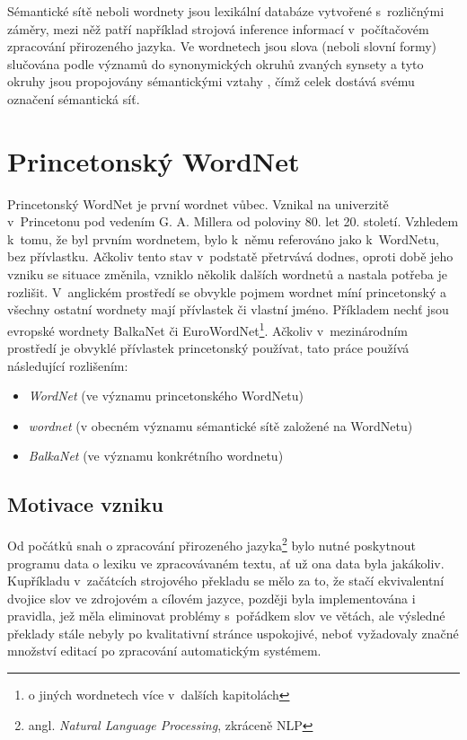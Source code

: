\documentclass[a4paper, 11pt, oneside, showtrims]{book}
\begin{document}
		{\noindent Sémantické sítě neboli wordnety jsou lexikální databáze vytvořené s~rozličnými záměry, mezi něž patří například strojová inference informací v~počítačovém zpracování přirozeného jazyka. Ve wordnetech jsou slova (neboli slovní formy) slučována podle významů do synonymických okruhů zvaných synsety a tyto okruhy jsou propojovány sémantickými vztahy \parencite{pala2013vceska, princetonWN}, čímž celek dostává svému označení sémantická síť.}

		\chapter{Princetonský WordNet} %
		\label{cha:princeton_wn}
		
			Princetonský WordNet je první wordnet vůbec. Vznikal na univerzitě v~Princetonu pod vedením G. A. Millera od poloviny 80. let 20. století. Vzhledem k~tomu, že byl prvním wordnetem, bylo k~němu referováno jako k~WordNetu, bez přívlastku. Ačkoliv tento stav v~podstatě přetrvává dodnes, oproti době jeho vzniku se situace změnila, vzniklo několik dalších wordnetů a nastala potřeba je rozlišit. V~anglickém prostředí se obvykle pojmem wordnet míní  princetonský a všechny ostatní wordnety mají přívlastek či vlastní jméno. Příkladem nechť jsou evropské wordnety BalkaNet či EuroWordNet\footnote{o jiných wordnetech více v~dalších kapitolách}. Ačkoliv v~mezinárodním prostředí je obvyklé přívlastek princetonský používat, tato práce používá následující rozlišením:

			\begin{itemize}
				\item \textit{WordNet} (ve významu princetonského WordNetu)
				\item \textit{wordnet} (v obecném významu sémantické sítě založené na WordNetu)
				\item \textit{BalkaNet} (ve významu konkrétního wordnetu)
			\end{itemize}

			\section{Motivace vzniku}
				Od počátků snah o zpracování přirozeného jazyka\footnote{angl. \textit{Natural Language Processing}, zkráceně NLP} bylo nutné poskytnout programu data o lexiku ve zpracovávaném textu, ať už ona data byla jakákoliv. Kupříkladu v~začátcích strojového překladu se mělo za to, že stačí ekvivalentní dvojice slov ve zdrojovém a cílovém jazyce, později byla implementována i pravidla, jež měla eliminovat problémy s~pořádkem slov ve větách, ale výsledné překlady stále nebyly po kvalitativní stránce uspokojivé, neboť vyžadovaly značné množství editací po zpracování automatickým systémem. \parencite{hutchins1982evolution}
\end{document}
